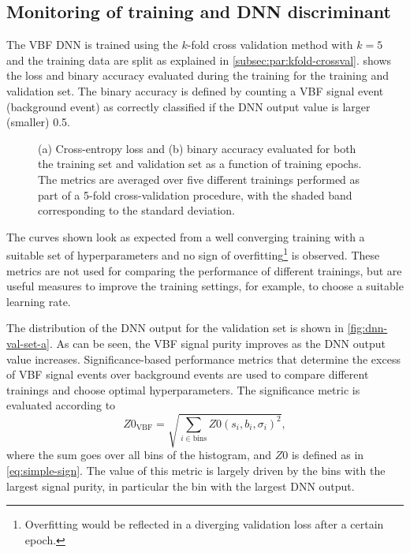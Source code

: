 \subsection{Monitoring of training and DNN discriminant}
\label{subsec:performance-metrics}
The VBF DNN is trained using the $k$-fold cross validation method with $k=5$ and the training data are split as explained in \cref{subsec:par:kfold-crossval}.
 shows the loss and binary accuracy evaluated during the training for the training and validation set. The binary accuracy is defined by counting a VBF signal event (background event) as correctly classified if the DNN output value is larger (smaller) 0.5.
\begin{figure}[t]
    \caption[Loss and accuracy for the training and validation set as a function of training epochs.]{(a) Cross-entropy loss and (b) binary accuracy evaluated for both the training set and validation set as a function of training epochs. The metrics are averaged over five different trainings performed as part of a 5-fold cross-validation procedure, with the shaded band corresponding to the standard deviation.}
    \label{fig:monitoring}
\end{figure}
The curves shown look as expected from a well converging training with a suitable set of hyperparameters and no sign of overfitting\footnote{Overfitting would be reflected in a diverging validation loss after a certain epoch.} is observed. These metrics are not used for comparing the performance of different trainings, but are useful measures to improve the training settings, for example, to choose a suitable learning rate.  

The distribution of the DNN output for the validation set is shown in \cref{fig:dnn-val-set-a}.
As can be seen, the VBF signal purity improves as the DNN output value increases.
Significance-based performance metrics that determine the excess of VBF signal events over background events are used to compare different trainings and choose optimal hyperparameters.
The significance metric is evaluated according to
\begin{equation}
    \label{eq:significance-performance-metric}
    Z0_{\mathrm{VBF}} = \sqrt{ \sum_{i \in \text{bins}} Z0(s_{i}, b_{i}, \sigma_{i})^2 },
\end{equation}
where the sum goes over all bins of the histogram, and $Z0$ is defined as in \cref{eq:simple-sign}.
The value of this metric is largely driven by the bins with the largest signal purity, in particular the bin with the largest DNN output.

